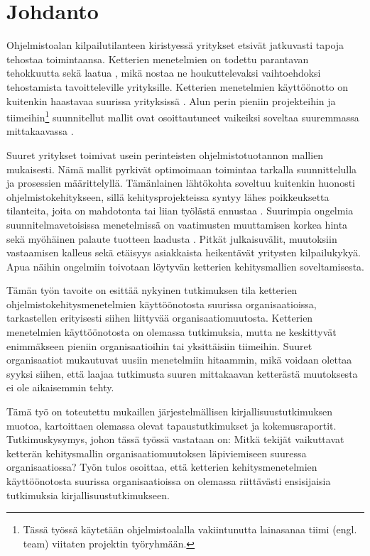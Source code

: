 
\section{Johdanto}

Ohjelmistoalan kilpailutilanteen kiristyessä yritykset etsivät jatkuvasti tapoja
tehostaa toimintaansa. Ketterien menetelmien on todettu parantavan tehokkuutta
sekä laatua , mikä nostaa ne houkuttelevaksi vaihtoehdoksi
tehostamista tavoitteleville yrityksille. Ketterien menetelmien käyttöönotto on
kuitenkin haastavaa suurissa yrityksissä . Alun perin pieniin
projekteihin ja tiimeihin\footnote{Tässä työssä käytetään ohjelmistoalalla
vakiintunutta lainasanaa tiimi (engl. team) viitaten projektin työryhmään.}
suunnitellut mallit ovat osoittautuneet vaikeiksi soveltaa suuremmassa
mittakaavassa .

Suuret yritykset toimivat usein perinteisten ohjelmistotuotannon mallien
mukaisesti. Nämä mallit pyrkivät optimoimaan toimintaa tarkalla suunnittelulla
ja prosessien määrittelyllä. Tämänlainen lähtökohta soveltuu kuitenkin huonosti
ohjelmistokehitykseen, sillä kehitysprojekteissa syntyy lähes poikkeuksetta
tilanteita, joita on mahdotonta tai liian työlästä ennustaa .
Suurimpia ongelmia suunnitelmavetoisissa menetelmissä on vaatimusten muuttamisen
korkea hinta sekä myöhäinen palaute tuotteen laadusta .
Pitkät julkaisuvälit, muutoksiin vastaamisen kalleus sekä etäisyys asiakkaista
heikentävät yritysten kilpailukykyä. Apua näihin ongelmiin toivotaan löytyvän
ketterien kehitysmallien soveltamisesta.

Tämän työn tavoite on esittää nykyinen tutkimuksen tila ketterien
ohjelmistokehitysmenetelmien käyttöönotosta suurissa organisaatioissa,
tarkastellen erityisesti siihen liittyvää organisaatiomuutosta. Ketterien
menetelmien käyttöönotosta on olemassa tutkimuksia, mutta ne keskittyvät
enimmäkseen pieniin organisaatioihin tai yksittäisiin tiimeihin. Suuret
organisaatiot mukautuvat uusiin menetelmiin hitaammin, mikä voidaan olettaa
syyksi siihen, että laajaa tutkimusta suuren mittakaavan ketterästä muutoksesta
ei ole aikaisemmin tehty.

Tämä työ on toteutettu mukaillen järjestelmällisen kirjallisuustutkimuksen
muotoa, kartoittaen olemassa olevat tapaustutkimukset ja kokemusraportit.
Tutkimuskysymys, johon tässä työssä vastataan on: Mitkä tekijät vaikuttavat
ketterän kehitysmallin organisaatiomuutoksen läpiviemiseen suuressa
organisaatiossa? Työn tulos osoittaa, että ketterien kehitysmenetelmien
käyttöönotosta suurissa organisaatioissa on olemassa riittävästi ensisijaisia
tutkimuksia kirjallisuustutkimukseen.

